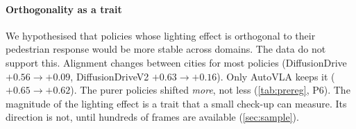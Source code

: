 \paragraph{Orthogonality as a trait}
We hypothesised that policies whose lighting effect is orthogonal to their pedestrian
response would be more stable across domains. The data do not support this. Alignment changes between cities for most policies
(DiffusionDrive $+0.56\to+0.09$, DiffusionDriveV2 $+0.63\to+0.16$). Only AutoVLA keeps it
($+0.65\to+0.62$). The purer policies shifted \emph{more}, not less (\cref{tab:prereg}, P6). The
magnitude of the lighting effect is a trait that a small check-up can measure. Its direction is not,
until hundreds of frames are available (\cref{sec:sample}).
